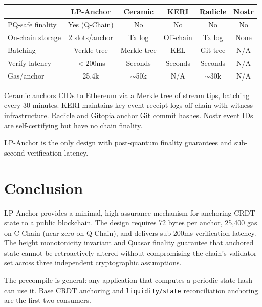 \documentclass[11pt,a4paper]{article}
\begin{document}
\begin{center}
\begin{tabular}{lccccc}
\toprule
 & \textbf{LP-Anchor} & \textbf{Ceramic} & \textbf{KERI} & \textbf{Radicle} & \textbf{Nostr} \\
\midrule
PQ-safe finality & Yes (Q-Chain) & No & No & No & No \\
On-chain storage & 2 slots/anchor & Tx log & Off-chain & Tx log & None \\
Batching & Verkle tree & Merkle tree & KEL & Git tree & N/A \\
Verify latency & $<200$ms & Seconds & Seconds & Seconds & N/A \\
Gas/anchor & 25.4k & $\sim$50k & N/A & $\sim$30k & N/A \\
\bottomrule
\end{tabular}
\end{center}

\noindent
Ceramic anchors CIDs to Ethereum via a Merkle tree of stream tips,
batching every 30 minutes. KERI maintains key event receipt logs off-chain
with witness infrastructure. Radicle and Gitopia anchor Git commit hashes.
Nostr event IDs are self-certifying but have no chain finality.

LP-Anchor is the only design with post-quantum finality guarantees and
sub-second verification latency.

\section{Conclusion}
\label{sec:conclusion}

LP-Anchor provides a minimal, high-assurance mechanism for anchoring
CRDT state to a public blockchain. The design requires 72 bytes per anchor,
25,400 gas on C-Chain (near-zero on Q-Chain), and delivers sub-200ms
verification latency. The height monotonicity invariant and Quasar finality
guarantee that anchored state cannot be retroactively altered without
compromising the chain's validator set across three independent
cryptographic assumptions.

The precompile is general: any application that computes a periodic state
hash can use it. Base CRDT anchoring and \texttt{liquidity/state}
reconciliation anchoring are the first two consumers.
\end{document}
